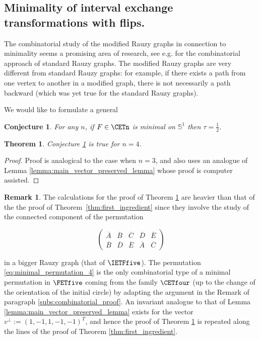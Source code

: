 \documentclass[12pt]{article}
\newtheorem{theorem}{Theorem}
\newtheorem{conjecture}{Conjecture}
\theoremstyle{definition}
\newtheorem*{remark}{Remark}
\begin{document}
\subsection{Minimality of interval exchange transformations with flips.}\label{subs:minimality_and_connections}
The combinatorial study of the modified Rauzy graphs in connection to minimality seems a promising area of research, see e.g. \cite{DM17} for the combinatorial approach of standard Rauzy graphs. The modified Rauzy graphs are very different from standard Rauzy graphs: for example, if there exists a path from one vertex to another in a modified graph, there is not necessarily a path backward (which was yet true for the standard Rauzy graphs).

\smallskip

We would like to formulate a general
\begin{conjecture}\label{conj:minimality}
For any $n$, if $F \in \CETn$ is minimal on $\mathbb{S}^1$ then $\tau=\frac{1}{2}$.
\end{conjecture}

\begin{theorem}\label{ref:thm_4}
Conjecture \ref{conj:minimality} is true for $n=4$.
\end{theorem}

\begin{proof}
Proof is analogical to the case when $n=3$, and also uses an analogue of Lemma \ref{lemma:main_vector_preserved_lemma} whose proof is computer assisted. 
\end{proof} 

\begin{remark}
The calculations for the proof of Theorem \ref{ref:thm_4} are heavier than that of the the proof of Theorem~\ref{thm:first_ingredient} since they involve the study of the connected component of the permutation

\begin{equation}\label{eq:minimal_permutation_4}
\begin{pmatrix}
\overline{A}&\overline{B}&\overline{C}&\overline{D}&\overline{E} \\
\overline{B}&\overline{D}&\overline{E}&\overline{A}&\overline{C}
\end{pmatrix}
\end{equation}

in a bigger Rauzy graph (that of $\IETFfive$). The permutation \eqref{eq:minimal_permutation_4} is the only combinatorial type of a minimal permutation in $\FETfive$ coming from the family $\CETfour$ (up to the change of the orientation of the initial circle) by adapting the argument in the Remark of paragraph \ref{subs:combinatorial_proof}. An invariant analogue to that of Lemma \ref{lemma:main_vector_preserved_lemma} exists for the vector $v^{\perp}:=(1,-1,1, -1,-1)^T$, and hence the proof of Theorem \ref{ref:thm_4} is repeated along the lines of the proof of Theorem \ref{thm:first_ingredient}.
\end{remark}
\end{document}
